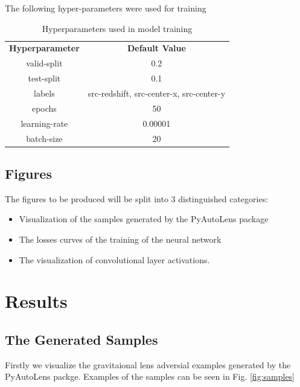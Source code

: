 \documentclass[12pt]{article}
\begin{document}
The following hyper-parameters were used for training

\begin{table}
    \centering
    \begin{tabular}{c|c}
        
        \textbf{Hyperparameter} & \textbf{Default Value} \\
        
        valid-split & 0.2 \\
        test-split & 0.1 \\
        labels & src-redshift, src-center-x, src-center-y \\
        epochs & 50 \\
        learning-rate & 0.00001 \\
        batch-size & 20 \\
    \end{tabular}
    \caption{Hyperparameters used in model training}
    \label{tab:nn_param}
\end{table}

\subsection{Figures}
The figures to be produced will be split into 3 distinguished categories:
\begin{itemize}
    \item Visualization of the samples generated by the PyAutoLens\cite{pyautolens} package
    \item The losses curves of the training of the neural network
    \item The visualization of convolutional layer activations.
\end{itemize}

\section{Results}
\subsection{The Generated Samples}
Firstly we visualize the gravitaional lens adversial examples generated by the PyAutoLens\cite{pyautolens} packge. Examples of the samples can be seen in Fig. \ref{fig:samples}
\end{document}
